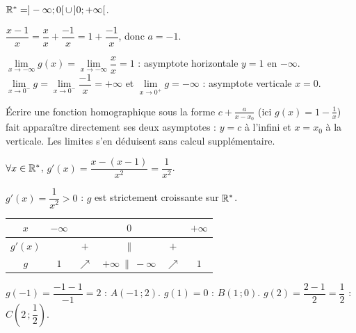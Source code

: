 \documentclass[11pt]{article}
\begin{document}
\begin{questions}
  \item \begin{sousq}
    \item $\mathbb{R}^* = ]-\infty;0[\,\cup\,]0;+\infty[$.
    \item $\dfrac{x-1}{x} = \dfrac{x}{x} + \dfrac{-1}{x} = 1 + \dfrac{-1}{x}$, donc $a = -1$.
    \item $\lim\limits_{x\to-\infty} g(x) = \lim\limits_{x\to-\infty}\dfrac{x}{x} = 1$ : asymptote horizontale $y = 1$ en $-\infty$. $\lim\limits_{x\to 0^-} g = \lim\limits_{x\to 0^-}\dfrac{-1}{x} = +\infty$ et $\lim\limits_{x\to 0^+} g = -\infty$ : asymptote verticale $x = 0$.

\begin{methode}
Écrire une fonction homographique sous la forme $c + \frac{a}{x - x_0}$
(ici $g(x) = 1 - \frac{1}{x}$) fait apparaître directement ses deux
asymptotes : $y = c$ à l'infini et $x = x_0$ à la verticale. Les
limites s'en déduisent sans calcul supplémentaire.
\end{methode}
  \end{sousq}
  \item \begin{sousq}
    \item $\forall x \in \mathbb{R}^*$, $g'(x) = \dfrac{x - (x-1)}{x^2} = \dfrac{1}{x^2}$.
    \item $g'(x) = \dfrac{1}{x^2} > 0$ : $g$ est strictement croissante sur $\mathbb{R}^*$.
    \item \begin{center}\renewcommand{\arraystretch}{1.4}
    \begin{tabular}{|c|ccccc|}
    \hline $x$ & $-\infty$ & & $0$ & & $+\infty$ \\\hline
    $g'(x)$ & & $+$ & $\|$ & $+$ & \\\hline
    $g$ & $1$ & $\nearrow$ & $+\infty\ \|\ -\infty$ & $\nearrow$ & $1$ \\\hline
    \end{tabular}
    \end{center}
  \end{sousq}
  \item \begin{sousq}
    \item $g(-1) = \dfrac{-1-1}{-1} = 2$ : $A(-1\,;2)$. $g(1) = 0$ : $B(1\,;0)$. $g(2) = \dfrac{2-1}{2} = \dfrac{1}{2}$ : $C\left(2\,;\dfrac{1}{2}\right)$.
    \item
    \begin{center}

\end{center}
\end{sousq}
\end{questions}
\end{document}
